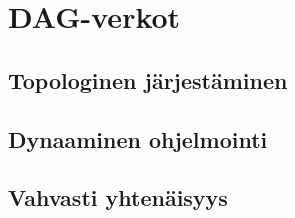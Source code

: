 \chapter{DAG-verkot}

\section{Topologinen järjestäminen}

\section{Dynaaminen ohjelmointi}

\section{Vahvasti yhtenäisyys}

